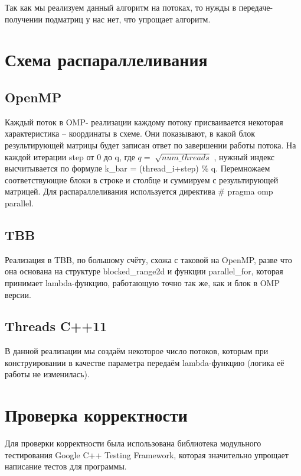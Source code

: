 \documentclass{report}
\begin{document}
Так как мы реализуем данный алгоритм на потоках, то нужды в передаче-получении подматриц у нас нет, что упрощает алгоритм.\par

\newpage

\section*{Схема распараллеливания}
\subsection{OpenMP}
Каждый поток в OMP- реализации каждому потоку присваивается некоторая характеристика – координаты в схеме. Они показывают, в какой блок результирующей матрицы будет записан ответ по завершении работы потока. На каждой итерации step от 0 до q, где  \( q=\sqrt[]{num \_ threads} \) , нужный индекс высчитывается по формуле k\_bar = (thread\_i+step) $\%$  q. Перемножаем соответствующие блоки в строке и столбце и суммируем с результирующей матрицей. Для распараллеливания используется директива $\#$ pragma omp parallel.\par

\subsection{TBB}
Реализация в TBB, по большому счёту, схожа с таковой на OpenMP, разве что она основана на структуре blocked\_range2d и функции parallel\_for, которая принимает lambda-функцию, работающую точно так же, как и блок в OMP версии.\par

\subsection{Threads C++11}
В данной реализации мы создаём некоторое число потоков, которым при конструировании в качестве параметра передаём lambda-функцию (логика её работы не изменилась).\par

\newpage

\section*{Проверка корректности}
Для проверки корректности была использована библиотека модульного тестирования Google C++ Testing Framework, которая значительно упрощает написание тестов для программы.\par
\end{document}
